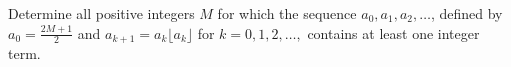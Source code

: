 Determine all positive integers $M$ for which the sequence $a_0,a_1,a_2,\dots$, defined by $a_0=\frac{2M+1}{2}$ and $a_{k+1}=a_k\lfloor a_k\rfloor$ for $k=0,1,2,\dots,$ contains at least one integer term.
